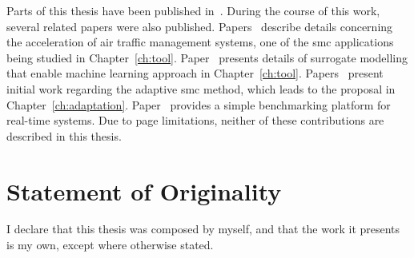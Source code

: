 Parts of this thesis have been published in~\cite{chau13fpt,chau13arc,chau14trets,chau14fccm}.
During the course of this work, several related papers were also published.
Papers~\cite{chau13acm,eele13cdc,eele13gnc} describe details concerning the acceleration of air traffic management systems, one of the \gls{smc} applications being studied in Chapter~\ref{ch:tool}.
Paper~\cite{kurek14fccm} presents details of surrogate modelling that enable machine learning approach in Chapter~\ref{ch:tool}.
Papers~\cite{chau12fpl,niu13fccm} present initial work regarding the adaptive \gls{smc} method, which leads to the proposal in Chapter~\ref{ch:adaptation}.
Paper~\cite{chau12heart} provides a simple benchmarking platform for real-time systems.
Due to page limitations, neither of these contributions are described in this thesis.

\section{Statement of Originality}

I declare that this thesis was composed by myself, and that the work it presents is my own, except where otherwise stated.

